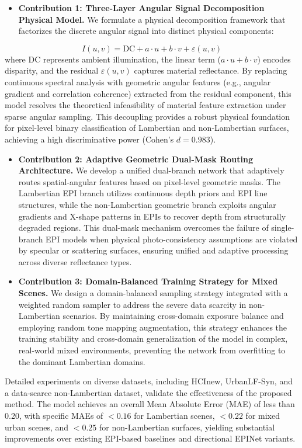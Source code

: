 \begin{itemize}\item \textbf{Contribution 1: Three-Layer Angular Signal Decomposition Physical Model.} We formulate a physical decomposition framework that factorizes the discrete angular signal into distinct physical components:\end{itemize}
 \begin{equation}
\label{eq:eq1}
I(u,v) = \text{DC} + a \cdot u + b \cdot v + \varepsilon(u,v)
\end{equation}
 where DC represents ambient illumination, the linear term ($a \cdot u + b \cdot v$) encodes disparity, and the residual $\varepsilon(u,v)$ captures material reflectance. By replacing continuous spectral analysis with geometric angular features (e.g., angular gradient and correlation coherence) extracted from the residual component, this model resolves the theoretical infeasibility of material feature extraction under sparse angular sampling. This decoupling provides a robust physical foundation for pixel-level binary classification of Lambertian and non-Lambertian surfaces, achieving a high discriminative power (Cohen's $d = 0.983$).

\begin{itemize}\item \textbf{Contribution 2: Adaptive Geometric Dual-Mask Routing Architecture.} We develop a unified dual-branch network that adaptively routes spatial-angular features based on pixel-level geometric masks. The Lambertian EPI branch utilizes continuous depth priors and EPI line structures, while the non-Lambertian geometric branch exploits angular gradients and X-shape patterns in EPIs to recover depth from structurally degraded regions. This dual-mask mechanism overcomes the failure of single-branch EPI models when physical photo-consistency assumptions are violated by specular or scattering surfaces, ensuring unified and adaptive processing across diverse reflectance types.\end{itemize}

\begin{itemize}\item \textbf{Contribution 3: Domain-Balanced Training Strategy for Mixed Scenes.} We design a domain-balanced sampling strategy integrated with a weighted random sampler to address the severe data scarcity in non-Lambertian scenarios. By maintaining cross-domain exposure balance and employing random tone mapping augmentation, this strategy enhances the training stability and cross-domain generalization of the model in complex, real-world mixed environments, preventing the network from overfitting to the dominant Lambertian domains.\end{itemize}

Detailed experiments on diverse datasets, including HCInew, UrbanLF-Syn, and a data-scarce non-Lambertian dataset, validate the effectiveness of the proposed method. The model achieves an overall Mean Absolute Error (MAE) of less than 0.20, with specific MAEs of $<0.16$ for Lambertian scenes, $<0.22$ for mixed urban scenes, and $<0.25$ for non-Lambertian surfaces, yielding substantial improvements over existing EPI-based baselines and directional EPINet variants.